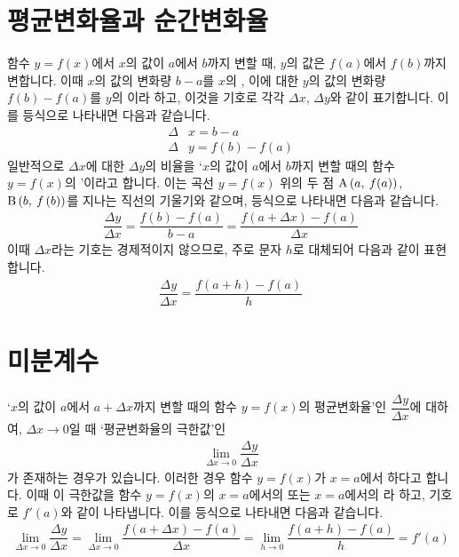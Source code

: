 \section{평균변화율과 순간변화율}
함수 $y=f\left( x \right) $에서 $x$의 값이 $a$에서 $b$까지 변할 때, $y$의 값은 $f\left( a \right) $에서 $f\left( b \right) $까지 변합니다. 이때 $x$의 값의 변화량 $b-a$를 $x$의 , 이에 대한 $y$의 값의 변화량 $f\left( b \right) - f\left( a \right) $를 $y$의 이라 하고, 이것을 기호로 각각 $\Delta x$, $\Delta y$와 같이 표기합니다. 이를 등식으로 나타내면 다음과 같습니다.
\begin{align*}
    \Delta &x = b-a \\
    \Delta &y = f\left( b \right) -f\left( a \right)
\end{align*}
일반적으로 $\Delta x$에 대한 $\Delta y$의 비율을 `$x$의 값이 $a$에서 $b$까지 변할 때의 함수 $y=f\left( x \right) $의 '이라고 합니다. 이는 곡선 $y=f\left( x \right) $ 위의 두 점 $\xy[A]{a}{f(a)}$, $\xy[B]{b}{f\left( b \right) }$를 지나는 직선의 기울기와 같으며, 등식으로 나타내면 다음과 같습니다.
\begin{align*} \dfrac{\Delta y}{\Delta x} = \dfrac{f\left( b \right) - f\left( a \right) }{b-a} = \dfrac{f\left( a+\Delta x \right) - f\left( a \right) }{\Delta x}\end{align*}
이때 $\Delta x$라는 기호는 경제적이지 않으므로, 주로 문자 $h$로 대체되어 다음과 같이 표현합니다. 
\begin{align*} \dfrac{\Delta y}{\Delta x} =  \dfrac{f\left( a+h \right) - f\left( a \right)  }{h}\end{align*}

\section{미분계수}
`$x$의 값이 $a$에서 $a+ \Delta x$까지 변할 때의 함수 $y=f\left( x \right) $의 평균변화율'인 $\dfrac{\Delta y}{\Delta x}$에 대하여, $\Delta x \to 0$일 때 `평균변화율의 극한값'인
\begin{align*} \lim_{\Delta x \to 0} \dfrac{\Delta y}{\Delta x} \end{align*}
가 존재하는 경우가 있습니다. 이러한 경우 함수 $y=f\left( x \right) $가 $x=a$에서 하다고 합니다. 이때 이 극한값을 함수 $y=f\left( x \right) $의 $x=a$에서의  또는 $x=a$에서의 라 하고, 기호로 $f'\left( a \right) $와 같이 나타냅니다. 이를 등식으로 나타내면 다음과 같습니다.
\begin{align*} \lim_{\Delta x \to 0} \dfrac{\Delta y}{\Delta x} = \lim_{\Delta x \to 0} \dfrac{f\left( a+ \Delta x \right) - f\left( a \right)  }{\Delta x}  = \lim_{h \to 0} \dfrac{f\left( a+h \right) - f\left( a \right)  }{h} =f'(a)\end{align*}

